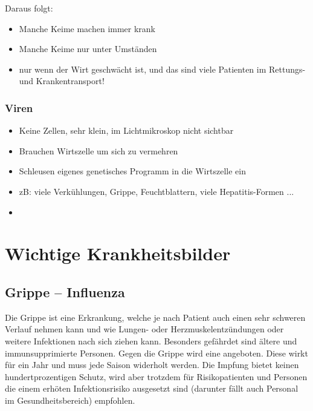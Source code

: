 Daraus folgt:
    \begin{itemize}
        \item Manche Keime machen immer krank
        \item Manche Keime nur unter Umst\"anden
        \item {} nur wenn der Wirt
        geschw\"acht ist, und das sind viele Patienten im Rettungs- und Krankentransport!
    \end{itemize}





\subsubsection{Viren}
\begin{itemize}
\item Keine Zellen, sehr klein, im Lichtmikroskop nicht sichtbar
\item Brauchen Wirtszelle um sich zu vermehren
\item Schleusen eigenes genetisches Programm in die Wirtszelle ein
\item zB: viele Verk\"uhlungen, Grippe, Feuchtblattern, viele
Hepatitis-Formen ...\item
{}
\end{itemize}




\section{Wichtige
Krankheitsbilder}


\subsection{Grippe -- Influenza}


Die Grippe ist eine  Erkrankung, welche je nach
Patient auch einen sehr schweren Verlauf nehmen kann und
 wie Lungen- oder
Herzmuskelentz\"undungen oder weitere Infektionen nach sich ziehen kann. Besonders gef\"ahrdet sind \"altere und immunsupprimierte
Personen. Gegen die Grippe wird eine 
angeboten. Diese wirkt f\"ur ein Jahr und muss jede Saison widerholt werden. Die Impfung
bietet keinen hundertprozentigen Schutz, wird aber trotzdem f\"ur
Risikopatienten und Personen die einem erh\"oten Infektionsrisiko
ausgesetzt sind (darunter f\"allt auch Personal im Gesundheitsbereich)
empfohlen. 

